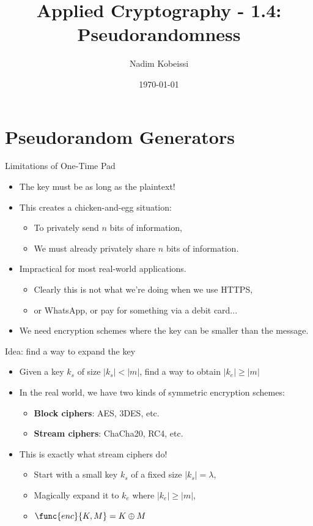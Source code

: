 \documentclass[aspectratio=169, lualatex, handout]{beamer}
\title{Applied Cryptography - 1.4: Pseudorandomness}
\author{Nadim Kobeissi}
\institute{American University of Beirut}
\date{\today}
\begin{document}
\begin{frame}[plain]
	\titlepage
\end{frame}

\section{Pseudorandom Generators}

\begin{frame}{Limitations of One-Time Pad}
	\begin{itemize}[<+->]
		\item The key must be as long as the plaintext!
		\item This creates a chicken-and-egg situation:
		      \begin{itemize}[<+->]
			      \item To privately send $n$ bits of information,
			      \item We must already privately share $n$ bits of information.
		      \end{itemize}
		\item Impractical for most real-world applications.
		      \begin{itemize}[<+->]
			      \item Clearly this is not what we're doing when we use HTTPS,
			      \item or WhatsApp, or pay for something via a debit card...
		      \end{itemize}
		\item We need encryption schemes where the key can be smaller than the message.
	\end{itemize}
\end{frame}

\begin{frame}{Idea: find a way to expand the key}
	\begin{itemize}[<+->]
		\item Given a key $k_s$ of size $\left|k_s\right| < \left|m\right|$, find a way to obtain $\left|k_e\right| \geq \left|m\right|$
		\item In the real world, we have two kinds of symmetric encryption schemes:
		      \begin{itemize}[<+->]
			      \item \textbf{Block ciphers}: AES, 3DES, etc.
			      \item \textbf{Stream ciphers}: ChaCha20, RC4, etc.
		      \end{itemize}
		\item This is exactly what stream ciphers do!
		      \begin{itemize}[<+->]
			      \item Start with a small key $k_s$ of a fixed size $\left|k_s\right| = \lambda$,
			      \item Magically expand it to $k_e$ where $\left|k_e\right| \geq \left|m\right|$,
			      \item $\func{enc}{K, M} = K \oplus M$
		      \end{itemize}
	\end{itemize}
\end{frame}
\end{document}
